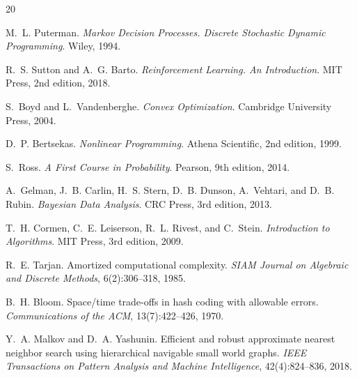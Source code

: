 \documentclass[11pt]{book}
\begin{document}
\begin{thebibliography}{20}

M.~L. Puterman.
\newblock \emph{Markov Decision Processes. Discrete Stochastic Dynamic Programming}.
\newblock Wiley, 1994.

R.~S. Sutton and A.~G. Barto.
\newblock \emph{Reinforcement Learning. An Introduction}.
\newblock MIT Press, 2nd edition, 2018.

S.~Boyd and L.~Vandenberghe.
\newblock \emph{Convex Optimization}.
\newblock Cambridge University Press, 2004.

D.~P. Bertsekas.
\newblock \emph{Nonlinear Programming}.
\newblock Athena Scientific, 2nd edition, 1999.

S.~Ross.
\newblock \emph{A First Course in Probability}.
\newblock Pearson, 9th edition, 2014.

A.~Gelman, J.~B. Carlin, H.~S. Stern, D.~B. Dunson, A.~Vehtari, and D.~B. Rubin.
\newblock \emph{Bayesian Data Analysis}.
\newblock CRC Press, 3rd edition, 2013.

T.~H. Cormen, C.~E. Leiserson, R.~L. Rivest, and C.~Stein.
\newblock \emph{Introduction to Algorithms}.
\newblock MIT Press, 3rd edition, 2009.

R.~E. Tarjan.
\newblock Amortized computational complexity.
\newblock \emph{SIAM Journal on Algebraic and Discrete Methods}, 6(2):306--318, 1985.

B.~H. Bloom.
\newblock Space/time trade-offs in hash coding with allowable errors.
\newblock \emph{Communications of the ACM}, 13(7):422--426, 1970.

Y.~A. Malkov and D.~A. Yashunin.
\newblock Efficient and robust approximate nearest neighbor search using hierarchical navigable small world graphs.
\newblock \emph{IEEE Transactions on Pattern Analysis and Machine Intelligence}, 42(4):824--836, 2018.

\end{thebibliography}

\end{document}
